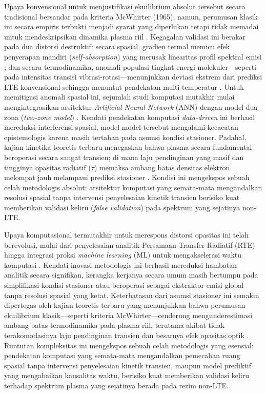 \documentclass[10pt,leqno]{amsart}
\begin{document}
Upaya konvensional untuk menjustifikasi ekuilibrium absolut tersebut secara tradisional bersandar pada kriteria McWhirter (1965); namun, perumusan klasik ini secara empiris terbukti menjadi syarat yang diperlukan tetapi tidak memadai untuk mendeskripsikan dinamika plasma riil \cite{bultel_mcwhirter_2025}. Kegagalan validasi ini berakar pada dua distorsi destruktif: secara spasial, gradien termal memicu efek penyerapan mandiri (\textit{self-absorption}) yang merusak linearitas profil spektral emisi \cite{tang_review_2024}; dan secara termodinamika, anomali populasi tingkat energi molekuler—seperti pada intensitas transisi vibrasi-rotasi—menunjukkan deviasi ekstrem dari prediksi LTE konvensional sehingga menuntut pendekatan multi-temperatur \cite{zaytsev_accurate_2026}. Untuk memitigasi anomali spasial ini, sejumlah studi komputasi mutakhir mulai mengintegrasikan arsitektur \textit{Artificial Neural Network} (ANN) dengan model dua-zona (\textit{two-zone model}) \cite{zaitsev_two-zone_2024, amogh_libs_2026,m_s_machine_2025}. Kendati pendekatan komputasi \textit{data-driven} ini berhasil mereduksi interferensi spasial, model-model tersebut mengalami kecacatan epistemologis karena masih tertahan pada asumsi kondisi stasioner. Padahal, kajian kinetika teoretis terbaru menegaskan bahwa plasma secara fundamental beroperasi secara sangat transien; di mana laju pendinginan yang masif dan tingginya opasitas radiatif ($\tau$) memaksa ambang batas densitas elektron melompat jauh melampaui prediksi stasioner \cite{bultel_mcwhirter_2025}. Kondisi ini mengekspos sebuah celah metodologis absolut: arsitektur komputasi yang semata-mata mengandalkan resolusi spasial tanpa intervensi penyelesaian kinetik transien berisiko kuat memberikan validasi keliru (\textit{false validation}) pada spektrum yang sejatinya non-LTE. 

Upaya komputasional termutakhir untuk merespons distorsi opasitas ini telah berevolusi, mulai dari penyelesaian analitik Persamaan Transfer Radiatif (RTE) \cite{favre_merlin_2025} hingga integrasi proksi \textit{machine learning} (ML) untuk mengakselerasi waktu komputasi \cite{favre_towards_2025}. Kendati inovasi metodologis ini berhasil mereduksi hambatan analitik secara signifikan, kerangka kerjanya secara umum masih bertumpu pada simplifikasi kondisi stasioner atau beroperasi sebagai ekstraktor emisi global tanpa resolusi spasial yang ketat. Keterbatasan dari asumsi stasioner ini semakin dipertegas oleh kajian teoretis terbaru yang menunjukkan bahwa perumusan ekuilibrium klasik—seperti kriteria McWhirter—cenderung mengunderestimasi ambang batas termodinamika pada plasma riil, terutama akibat tidak terakomodasinya laju pendinginan transien dan besarnya efek opasitas optik \cite{bultel_mcwhirter_2025}. Runtutan kompleksitas ini mengekspos sebuah celah metodologis yang esensial: pendekatan komputasi yang semata-mata mengandalkan pemecahan ruang spasial tanpa intervensi penyelesaian kinetik transien, maupun model prediktif yang mengabaikan kausalitas waktu, berisiko kuat memberikan validasi keliru terhadap spektrum plasma yang sejatinya berada pada rezim non-LTE.
\end{document}
